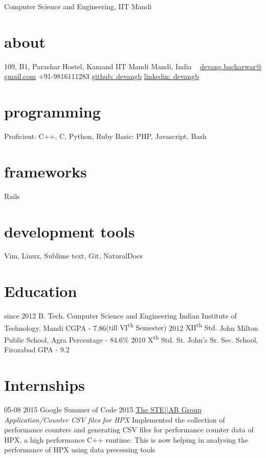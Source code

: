 \documentclass[]{friggeri-cv}
\begin{document}
       {Computer Science and Engineering, IIT Mandi}


\begin{aside}
  \section{about}
    109, B1, Parashar Hostel, Kamand
    IIT Mandi
    Mandi, India
    ~
    \href{mailto:devang.bacharwar@gmail.com}{devang.bacharwar@ gmail.com}
    {+91-9816111283}
    \href{https://github.com/devangb}{github: devangb}
    \href{https://in.linkedin.com/in/devangb}{linkedin: devangb}
  \section{programming}
    Proficient: C++, C, Python, Ruby
    Basic: PHP, Javascript, Bash
  \section{frameworks}
  	Rails
  \section{development tools}
  	Vim, Linux, Sublime text, Git, NaturalDocs
\end{aside}


\section{Education}

\begin{entrylist}
  \entry
    {since 2012}
    {B. Tech. {\normalfont Computer Science and Engineering}}
    {Indian Institute of Technology, Mandi}
    {CGPA - 7.86{\small (till VI\textsuperscript{th} Semester)}}
  \entry
    {2012}
    {XII\textsuperscript{th} Std.}
    {John Milton Public School, Agra}
    {Percentage - 84.6\%}
  \entry
    {2010}
    {X\textsuperscript{th} Std.}
    {St. John's Sr. Sec. School, Firozabad}
    {GPA - 9.2}
\end{entrylist}

\section{Internships}
\begin{entrylist}
  \internentry
    {05-08 2015}
    {Google Summer of Code 2015}
    {\href{http://stellar.cct.lsu.edu/}{The STE||AR Group}}
    {\emph{Application/Counter CSV files for HPX}}
    {Implemented the collection of performance counters and generating CSV files for performance counter data of HPX, a high performance C++ runtime. This is now helping in analysing the performance of HPX using data precessing tools}
\end{entrylist}
\end{document}
